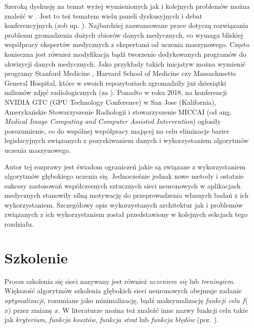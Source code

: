Szeroką dyskusję na temat wyżej wymienionych jak i kolejnych problemów można znaleźć w \cite{Marcus2018}. Jest to też tematem wielu paneli dyskusyjnych i debat konferencyjnych (zob np. \cite{NVIDIApanel}). Najbardziej zaawansowane prace dotyczą rozwiązania problemu gromadzenia dużych zbiorów danych medycznych, co wymaga bliskiej współpracy ekspertów medycznych z ekspertami od uczenia maszynowego. Często konieczna jest również modyfikacja bądź tworzenie dedykowanych programów do akwizycji danych medycznych. Jako przykłady takich inicjatyw można wymienić programy Stanford Medicine \cite{MedicalImageNet}, Harvard School of Medicine \cite{HMS} czy Massachusetts General Hospital, które w swoich repozytoriach zgromadziły już dziesiątki milionów zdjęć radiologicznych (za \cite{MGH}). Ponadto w roku 2018, na konferencji NVIDIA GTC (GPU Technology Conference) w San Jose (Kalifornia), Amerykańskie Stowarzyszenie Radiologii i stowarzyszenie MICCAI (od ang. \textit{Medical Image Computing and Computer Assisted Intervention}) ogłosiły porozumienie, co do wspólnej współpracy mającej na celu eliminacje barier legislacyjnych związanych z pozyskiwaniem danych i wykorzystaniem algorytmów uczenia maszynowego.

Autor tej rozprawy jest świadom ograniczeń jakie są związane z wykorzystaniem algorytmów głębokiego uczenia się. Jednocześnie jednak nowe metody i ostatnie sukcesy zastosowań współczesnych sztucznych sieci neuronowych w aplikacjach medycznych stanowiły silną motywację do przeprowadzenia własnych badań z ich wykorzystaniem. Szczegółowy opis wykorzystanych architektur jak i problemów związanych z ich wykorzystaniem został przedstawiony w kolejnych sekcjach tego rozdziału.
 

\section{Szkolenie}

Proces szkolenia się sieci nazywany jest również \textit{uczeniem się} lub \textit{treningiem}. Większość algorytmów szkolenia głębokich sieci neuronowych obejmuje zadanie \textit{optymalizacji}, rozumiane jako minimalizację, bądź maksymalizację \textit{funkcji celu} $f$($x$) przez zmianę $x$. W literaturze można też znaleźć inne nazwy funkcji celu takie jak \textit{kryterium}, \textit{funkcja kosztów}, \textit{funkcja strat} lub \textit{funkcja błędów} (por. \cite{Goodfellow-et-al-2016}). 

